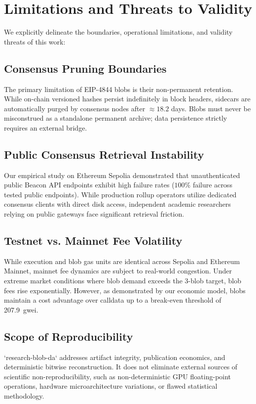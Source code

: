 \section{Limitations and Threats to Validity}
\label{sec:limitations}

We explicitly delineate the boundaries, operational limitations, and validity threats of this work:

\subsection{Consensus Pruning Boundaries}
The primary limitation of EIP-4844 blobs is their non-permanent retention. While on-chain versioned hashes persist indefinitely in block headers, sidecars are automatically purged by consensus nodes after $\approx 18.2$ days. Blobs must never be misconstrued as a standalone permanent archive; data persistence strictly requires an external bridge.

\subsection{Public Consensus Retrieval Instability}
Our empirical study on Ethereum Sepolia demonstrated that unauthenticated public Beacon API endpoints exhibit high failure rates ($100\%$ failure across tested public endpoints). While production rollup operators utilize dedicated consensus clients with direct disk access, independent academic researchers relying on public gateways face significant retrieval friction.

\subsection{Testnet vs. Mainnet Fee Volatility}
While execution and blob gas units are identical across Sepolia and Ethereum Mainnet, mainnet fee dynamics are subject to real-world congestion. Under extreme market conditions where blob demand exceeds the 3-blob target, blob fees rise exponentially. However, as demonstrated by our economic model, blobs maintain a cost advantage over calldata up to a break-even threshold of 207.9~gwei.

\subsection{Scope of Reproducibility}
`research-blob-da` addresses artifact integrity, publication economics, and deterministic bitwise reconstruction. It does not eliminate external sources of scientific non-reproducibility, such as non-deterministic GPU floating-point operations, hardware microarchitecture variations, or flawed statistical methodology.
